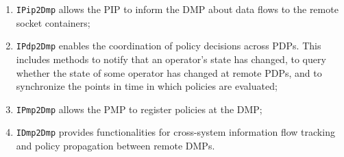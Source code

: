 \begin{enumerate}
    \item \texttt{IPip2Dmp} allows the PIP to inform the DMP about data flows to the remote socket
    containers;
    \item \texttt{IPdp2Dmp} enables the coordination of policy decisions across PDPs. This includes methods to notify
    that an operator’s state has changed, to query whether the state of some operator has changed at remote PDPs, and
    to synchronize the points in time in which policies are evaluated;
    \item \texttt{IPmp2Dmp} allows the PMP to register policies at
    the DMP;
    \item \texttt{IDmp2Dmp} provides functionalities for cross-system information flow tracking and policy propagation between
    remote DMPs.
\end{enumerate}






